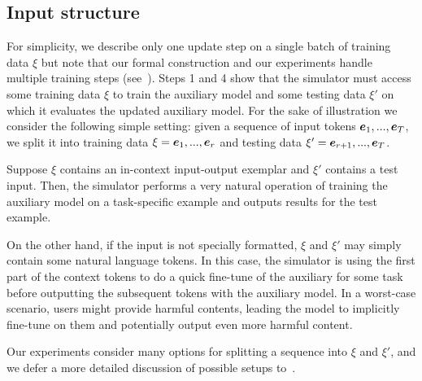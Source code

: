\subsection{Input structure}\label{sec:input_structure}
For simplicity, we describe only one update step on a single batch of training data $\xi$ but note that our formal construction and our experiments handle multiple training steps (see~).
Steps 1 and 4 show that the simulator must access some training data $\xi$ to train the auxiliary model and some testing data $\xi'$ on which it evaluates the updated auxiliary model. 
For the sake of illustration we consider the following simple setting: given a sequence of input tokens $\ve_1,...,\ve_T$, we split it into training data $\xi=\ve_1,...,\ve_r$ and testing data $\xi'=\ve_{r+1},...,\ve_T$.

Suppose $\xi$ contains an in-context input-output exemplar and $\xi'$ contains a test input.
Then, the simulator performs a very natural operation of training the auxiliary model on a task-specific example and outputs results for the test example. 

On the other hand, if the input is not specially formatted, $\xi$ and $\xi'$ may simply contain some natural language tokens.
In this case, the simulator is using the first part of the context tokens to do a quick fine-tune of the auxiliary for some task before outputting the subsequent tokens with the auxiliary model. In a worst-case scenario, users might provide harmful contents, leading the model to implicitly fine-tune on them and potentially output even more harmful content. 


Our experiments consider many options for splitting a sequence into $\xi$ and $\xi'$, and we defer a more detailed discussion of possible setups to~.

